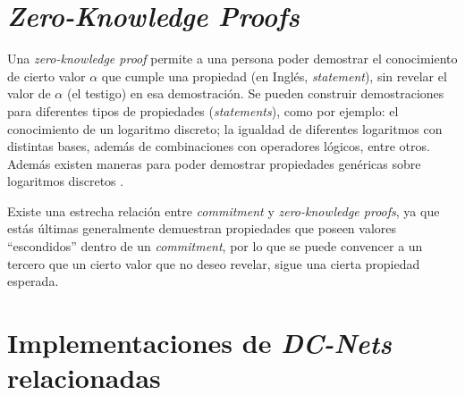 \section{\emph{Zero-Knowledge Proofs}}

Una \emph{zero-knowledge proof} permite a una persona poder demostrar el conocimiento de cierto valor $\alpha$ que cumple una propiedad 
  (en Inglés, \emph{statement}), sin revelar el valor 
  de $\alpha$ (el testigo) en esa demostración.
Se pueden construir demostraciones para diferentes tipos de propiedades 
  (\emph{statements}), como por ejemplo: el conocimiento de un logaritmo 
  discreto; la igualdad de diferentes logaritmos con distintas bases, además de combinaciones con operadores lógicos, entre otros. 
Además existen maneras para poder demostrar propiedades genéricas sobre
  logaritmos discretos 
  \cite{camenisch1997proof}.
  
  
Existe una estrecha relación entre \emph{commitment} y \emph{zero-knowledge proofs}, ya que estás últimas generalmente demuestran propiedades que poseen valores ``escondidos'' dentro de un \emph{commitment}, por lo que se puede convencer a un tercero que un cierto valor que no deseo revelar, sigue una cierta propiedad esperada.

\section{Implementaciones de \emph{DC-Nets} relacionadas}

